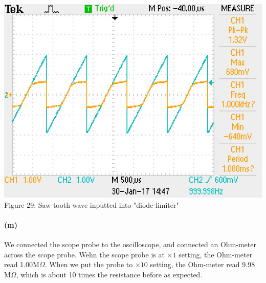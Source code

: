 \documentclass[]{article}
\begin{document}
\begin{center}
	\includegraphics[scale=0.8]{l_sawtooth}\\
	Figure 29: Saw-tooth wave inputted into "diode-limiter" 
\end{center}
	\paragraph{ (m)}
We connected the scope probe to the oscilloscope, and connected an Ohm-meter across the scope probe. Wehn the scope probe is at $\times 1$ setting, the Ohm-meter read 1.00M$\Omega$. When we put the probe to $\times 10$ setting, the Ohm-meter read 9.98 M$\Omega$, which is about 10 times the resistance before as expected. 
\end{document}
